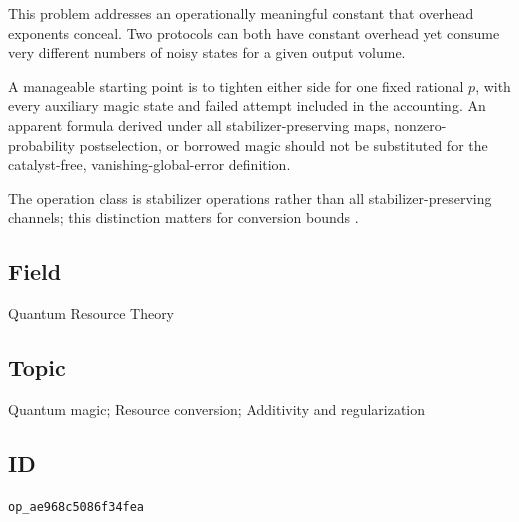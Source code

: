 This problem addresses an operationally meaningful constant that overhead exponents conceal. Two protocols can both have constant overhead yet consume very different numbers of noisy states for a given output volume.

A manageable starting point is to tighten either side for one fixed rational $p$, with every auxiliary magic state and failed attempt included in the accounting. An apparent formula derived under all stabilizer-preserving maps, nonzero-probability postselection, or borrowed magic should not be substituted for the catalyst-free, vanishing-global-error definition.

The operation class is stabilizer operations rather than all stabilizer-preserving channels; this distinction matters for conversion bounds .

\subsection*{Field}

Quantum Resource Theory

\subsection*{Topic}

Quantum magic; Resource conversion; Additivity and regularization

\subsection*{ID}

\texttt{op\_ae968c5086f34fea}
